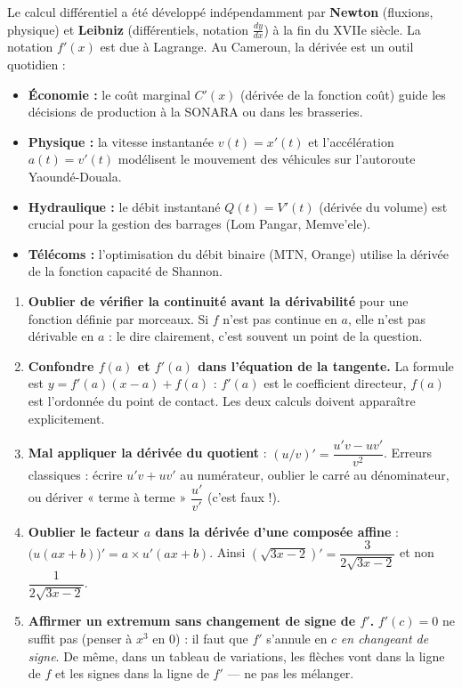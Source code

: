 \documentclass[11pt]{article}
\begin{document}
\begin{savaistu}
Le calcul différentiel a été développé indépendamment par \textbf{Newton} (fluxions, physique) et \textbf{Leibniz} (différentiels, notation $\frac{dy}{dx}$) à la fin du XVIIe siècle. La notation $f'(x)$ est due à Lagrange.
Au Cameroun, la dérivée est un outil quotidien :
\begin{itemize}
\item \textbf{Économie :} le coût marginal $C'(x)$ (dérivée de la fonction coût) guide les décisions de production à la SONARA ou dans les brasseries.
\item \textbf{Physique :} la vitesse instantanée $v(t)=x'(t)$ et l'accélération $a(t)=v'(t)$ modélisent le mouvement des véhicules sur l'autoroute Yaoundé-Douala.
\item \textbf{Hydraulique :} le débit instantané $Q(t)=V'(t)$ (dérivée du volume) est crucial pour la gestion des barrages (Lom Pangar, Memve'ele).
\item \textbf{Télécoms :} l'optimisation du débit binaire (MTN, Orange) utilise la dérivée de la fonction capacité de Shannon.
\end{itemize}
\end{savaistu}

\begin{attention}
\begin{enumerate}
\item \textbf{Oublier de vérifier la continuité avant la dérivabilité} pour une fonction définie par morceaux. Si $f$ n'est pas continue en $a$, elle n'est pas dérivable en $a$ : le dire clairement, c'est souvent un point de la question.
\item \textbf{Confondre $f(a)$ et $f'(a)$ dans l'équation de la tangente.} La formule est $y=f'(a)(x-a)+f(a)$ : $f'(a)$ est le coefficient directeur, $f(a)$ est l'ordonnée du point de contact. Les deux calculs doivent apparaître explicitement.
\item \textbf{Mal appliquer la dérivée du quotient} : $(u/v)'=\dfrac{u'v-uv'}{v^2}$. Erreurs classiques : écrire $u'v+uv'$ au numérateur, oublier le carré au dénominateur, ou dériver « terme à terme » $\dfrac{u'}{v'}$ (c'est faux !).
\item \textbf{Oublier le facteur $a$ dans la dérivée d'une composée affine} : $\big(u(ax+b)\big)'=a\times u'(ax+b)$. Ainsi $(\sqrt{3x-2})'=\dfrac{3}{2\sqrt{3x-2}}$ et non $\dfrac{1}{2\sqrt{3x-2}}$.
\item \textbf{Affirmer un extremum sans changement de signe de $f'$.} $f'(c)=0$ ne suffit pas (penser à $x^3$ en $0$) : il faut que $f'$ s'annule en $c$ \emph{en changeant de signe}. De même, dans un tableau de variations, les flèches vont dans la ligne de $f$ et les signes dans la ligne de $f'$ — ne pas les mélanger.
\end{enumerate}
\end{attention}
\end{document}

